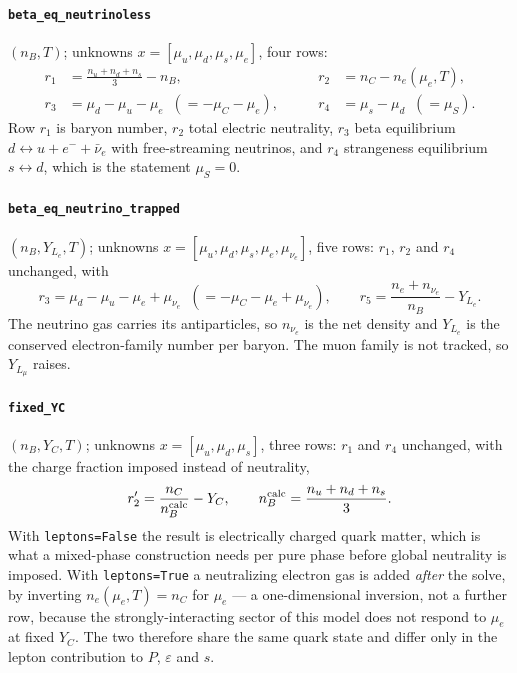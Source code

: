 \documentclass[aps,prc,onecolumn,superscriptaddress,nofootinbib,10pt]{revtex4-2}
\newcommand{\nB}{n_B}
\newcommand{\nC}{n_C}
\newcommand{\muC}{\mu_C}
\newcommand{\muS}{\mu_S}
\newcommand{\munue}{\mu_{\nu_e}}
\begin{document}
\paragraph{\texttt{beta\_eq\_neutrinoless}} $(\nB, T)$; unknowns
$x = [\mu_u, \mu_d, \mu_s, \mu_e]$, four rows:
%
\begin{equation}
\begin{aligned}
r_1 &= \frac{n_u + n_d + n_s}{3} - \nB ,
&\qquad r_2 &= \nC - n_e(\mu_e, T) , \\
r_3 &= \mu_d - \mu_u - \mu_e \;\; (= -\muC - \mu_e) ,
&\qquad r_4 &= \mu_s - \mu_d \;\; (= \muS) .
\end{aligned}
\label{eq:res_beta}
\end{equation}
%
Row $r_1$ is baryon number, $r_2$ total electric neutrality, $r_3$ beta
equilibrium $d \leftrightarrow u + e^- + \bar\nu_e$ with free-streaming
neutrinos, and $r_4$ strangeness equilibrium $s \leftrightarrow d$, which is
the statement $\muS = 0$.

\paragraph{\texttt{beta\_eq\_neutrino\_trapped}} $(\nB, Y_{L_e}, T)$; unknowns
$x = [\mu_u, \mu_d, \mu_s, \mu_e, \munue]$, five rows: $r_1$, $r_2$ and $r_4$
unchanged, with
%
\begin{equation}
r_3 = \mu_d - \mu_u - \mu_e + \munue \;\; (= -\muC - \mu_e + \munue) ,
\qquad
r_5 = \frac{n_e + n_{\nu_e}}{\nB} - Y_{L_e} .
\end{equation}
%
The neutrino gas carries its antiparticles, so $n_{\nu_e}$ is the net density
and $Y_{L_e}$ is the conserved electron-family number per baryon. The muon
family is not tracked, so $Y_{L_\mu}$ raises.

\paragraph{\texttt{fixed\_YC}} $(\nB, Y_C, T)$; unknowns
$x = [\mu_u, \mu_d, \mu_s]$, three rows: $r_1$ and $r_4$ unchanged, with the
charge fraction imposed instead of neutrality,
%
\begin{equation}
r_2' = \frac{\nC}{\nB^{\rm calc}} - Y_C , \qquad
\nB^{\rm calc} = \frac{n_u + n_d + n_s}{3} .
\end{equation}
%
With \texttt{leptons=False} the result is electrically charged quark matter,
which is what a mixed-phase construction needs per pure phase before global
neutrality is imposed. With \texttt{leptons=True} a neutralizing electron gas
is added \emph{after} the solve, by inverting $n_e(\mu_e, T) = \nC$ for
$\mu_e$ --- a one-dimensional inversion, not a further row, because the
strongly-interacting sector of this model does not respond to $\mu_e$ at fixed
$Y_C$. The two therefore share the same quark state and differ only in the
lepton contribution to $P$, $\varepsilon$ and $s$.
\end{document}
